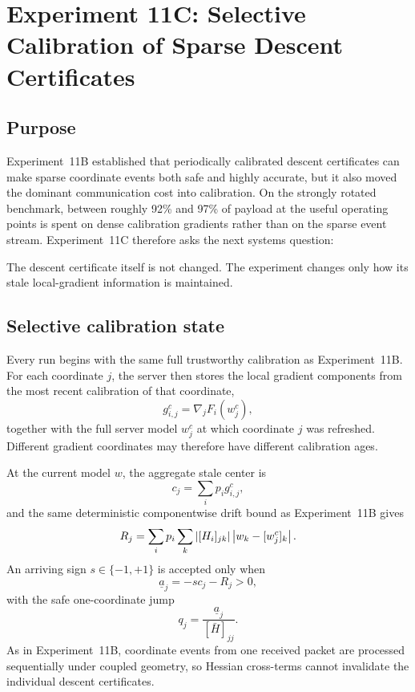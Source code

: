 \section{Experiment 11C: Selective Calibration of Sparse Descent Certificates}
\label{sec:exp11c}

\subsection{Purpose}

Experiment~11B established that periodically calibrated descent certificates can make sparse coordinate events both safe and highly accurate, but it also moved the dominant communication cost into calibration. On the strongly rotated benchmark, between roughly 92\% and 97\% of payload at the useful operating points is spent on dense calibration gradients rather than on the sparse event stream. Experiment~11C therefore asks the next systems question:
\begin{center}
\end{center}
The descent certificate itself is not changed. The experiment changes only how its stale local-gradient information is maintained.

\subsection{Selective calibration state}

Every run begins with the same full trustworthy calibration as Experiment~11B. For each coordinate $j$, the server then stores the local gradient components from the most recent calibration of that coordinate,
\begin{equation}
  g^c_{i,j}=\nabla_jF_i(w_j^c),
\end{equation}
together with the full server model $w_j^c$ at which coordinate $j$ was refreshed. Different gradient coordinates may therefore have different calibration ages.

At the current model $w$, the aggregate stale center is
\begin{equation}
  c_j=\sum_i p_i g^c_{i,j},
\end{equation}
and the same deterministic componentwise drift bound as Experiment~11B gives
\begin{equation}
  R_j
  =
  \sum_i p_i
  \sum_k \left|[H_i]_{jk}\right|\left|w_k-[w_j^c]_k\right|.
  \label{eq:11c-radius}
\end{equation}
An arriving sign $s\in\{-1,+1\}$ is accepted only when
\begin{equation}
  \underline a_j=-s c_j-R_j>0,
\end{equation}
with the safe one-coordinate jump
\begin{equation}
  q_j=\frac{\underline a_j}{[\bar H]_{jj}}.
\end{equation}
As in Experiment~11B, coordinate events from one received packet are processed sequentially under coupled geometry, so Hessian cross-terms cannot invalidate the individual descent certificates.

